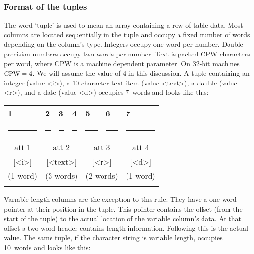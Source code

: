 \medskip
 
\subsubsection{Format of the tuples}
%
The word `tuple' is used to mean an array containing a row of table data.
Most columns are located sequentially in the tuple and
occupy a fixed number of words depending on the column's type.
Integers occupy one word per number.  Double precision numbers
occupy two words per number.  Text is packed {\small CPW}
characters per word, where {\small CPW} is a machine dependent
parameter.  On 32-bit machines $\mbox{\small CPW}=4$. We will
assume the value of 4 in this discussion.
A tuple containing an integer (value <i>), a 10-character text item
(value <text>),
a double (value <r>),
and a date (value <d>) occupies 7~words and looks like this:
 
\smallskip
{\centering\small{}
 \def\strut{\rule{0pt}{2pt}} \def\Strut{\rule{0pt}{12pt}}
 \def\fl{\multicolumn{1}{|l|}}
\begin{tabular}{|c|c|c|c|c|c|c|}
 \fl{1}&\fl{2}&\fl{3}&\fl{4}&\fl{5}&\fl{6}&\fl{7}\\
 \hline
   \rule{38pt}{0pt}&
   \rule{38pt}{0pt}&
   \rule{38pt}{0pt}&
   \rule{38pt}{0pt}&
   \rule{38pt}{0pt}&
   \rule{38pt}{0pt}&
   \rule{38pt}{0pt}\\
 \Strut att 1&
 \multicolumn{3}{|c|}{att 2}&
 \multicolumn{2}{|c|}{att 3}&
 att 4\\
 \Strut [<i>]&
 \multicolumn{3}{|c|}{[<text>]}&
 \multicolumn{2}{|c|}{[<r>]}&
 [<d>]\\
 \Strut (1 word)&
 \multicolumn{3}{|c|}{(3 words)}&
 \multicolumn{2}{|c|}{(2 words)}&
 (1 word)\\
 &&&&&&\\
 \hline
\end{tabular}
 \par}
 
\medskip
Variable length columns are the exception to this rule.
They have a one-word pointer at their position in the tuple.
This pointer contains the offset (from the start of the tuple)
to the actual location of the variable column's data.
At that offset a two word header contains length information.
Following this is the actual value.
The same tuple, if the character string is variable length,
occupies 10~words and
looks like this:
 
